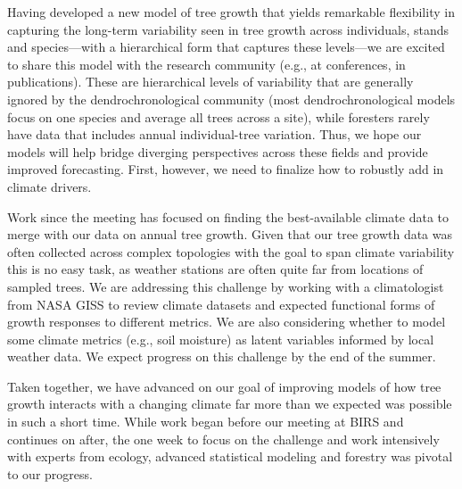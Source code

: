 Having developed a new model of tree growth that yields remarkable flexibility in capturing the long-term variability seen in tree growth across individuals, stands and species---with a hierarchical form that captures these levels---we are excited to share this model with the research community (e.g., at conferences, in publications). These are hierarchical levels of variability that are generally ignored by the dendrochronological community (most dendrochronological models focus on one species and average all trees across a site), while foresters rarely have data that includes annual individual-tree variation. Thus, we hope our models will help bridge diverging perspectives across these fields and provide improved forecasting. First, however, we need to finalize how to robustly add in climate drivers.

Work since the meeting has focused on finding the best-available climate data to merge with our data on annual tree growth. Given that our tree growth data was often collected across complex topologies with the goal to span climate variability this is no easy task, as weather stations are often quite far from locations of sampled trees. We are addressing this challenge by working with a climatologist from NASA GISS to review climate datasets and expected functional forms of growth responses to different metrics. We are also considering whether to model some climate metrics (e.g., soil moisture) as latent variables informed by local weather data. We expect progress on this challenge by the end of the summer. 

Taken together, we have advanced on our goal of improving models of how tree growth interacts with a changing climate far more than we expected was possible in such a short time. While work began before our meeting at BIRS and continues on after, the one week to focus on the challenge and work intensively with experts from ecology, advanced statistical modeling and forestry was pivotal to our progress. 

